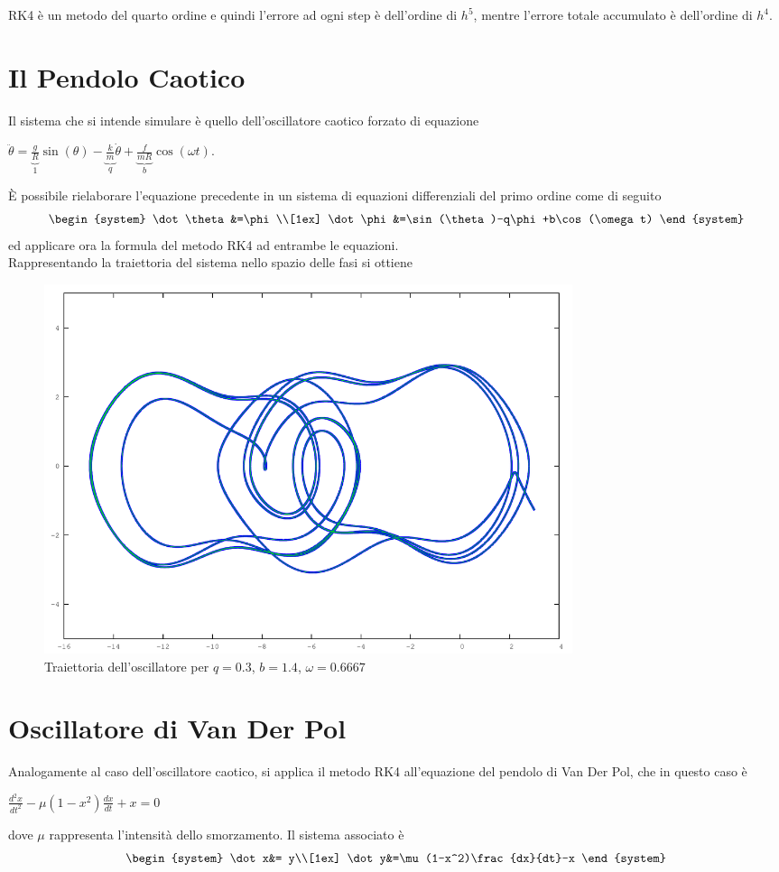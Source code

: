 RK4 è un metodo del quarto ordine e quindi l'errore ad ogni step è dell'ordine di $h^5$, mentre l'errore totale accumulato è dell'ordine di $h^4$.

\section{Il Pendolo Caotico}
Il sistema che si intende simulare è quello dell'oscillatore caotico forzato di equazione
\begin{center}
$\ddot{\theta} = \underbrace{\frac{g}{R}}_1 \sin(\theta)-\underbrace{\frac{k}{m}}_q \dot{\theta}+\underbrace{\frac{f}{mR}}_b \cos(\omega t)$.
\end{center}
È possibile rielaborare l'equazione precedente in un sistema di equazioni differenziali del primo ordine come di seguito
$$\begin{system}
\dot\theta&=\phi \\[1ex] \dot\phi&=\sin(\theta)-q\phi+b\cos(\omega t)
\end{system}$$
ed applicare ora la formula del metodo RK4 ad entrambe le equazioni.
\\

Rappresentando la traiettoria del sistema nello spazio delle fasi si ottiene
\begin{figure}[H]
\centering
\includegraphics[width=0.75\textwidth]{chaotic}
\caption{Traiettoria dell'oscillatore per $q = 0.3$, $b = 1.4$, $\omega = 0.6667$}
\label{fig:chaotic}
\end{figure}

\section{Oscillatore di Van Der Pol}
Analogamente al caso dell'oscillatore caotico, si applica il metodo RK4 all'equazione del pendolo di Van Der Pol, che in questo caso è
\begin{center}
$\frac{d^2x}{dt^2}-\mu(1-x^2)\frac{dx}{dt}+x= 0$
\end{center}
dove $\mu$ rappresenta l'intensità dello smorzamento. Il sistema associato è
$$\begin{system}
\dot x&= y\\[1ex] \dot y&=\mu(1-x^2)\frac{dx}{dt}-x
\end{system}$$

